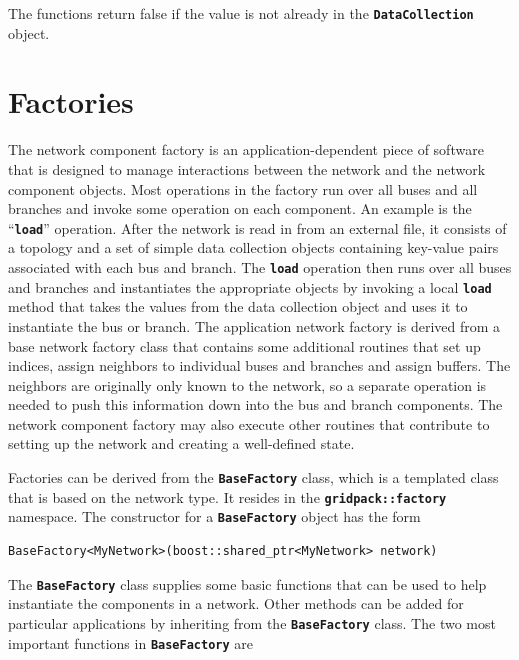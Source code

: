 \documentclass[12pt]{report} %
\begin{document}
The functions return false if the value is not already in the \texttt{\textbf{DataCollection}} object.

\section{Factories}

The network component factory is an application-dependent piece of software that is designed to manage interactions between the network and the network component objects. Most operations in the factory run over all buses and all branches and invoke some operation on each component. An example is the ``\texttt{\textbf{load}}'' operation. After the network is read in from an external file, it consists of a topology and a set of simple data collection objects containing key-value pairs associated with each bus and branch. The \texttt{\textbf{load}} operation then runs over all buses and branches and instantiates the appropriate objects by invoking a local \texttt{\textbf{load}} method that takes the values from the data collection object and uses it to instantiate the bus or branch. The application network factory is derived from a base network factory class that contains some additional routines that set up indices, assign neighbors to individual buses and branches and assign buffers. The neighbors are originally only known to the network, so a separate operation is needed to push this information down into the bus and branch components. The network component factory may also execute other routines that contribute to setting up the network and creating a well-defined state.

Factories can be derived from the \texttt{\textbf{BaseFactory}} class, which is a templated class that is based on the network type. It resides in the \texttt{\textbf{gridpack::factory}} namespace. The constructor for a \texttt{\textbf{BaseFactory}} object has the form

{
\color{red}
\begin{Verbatim}[fontseries=b]
BaseFactory<MyNetwork>(boost::shared_ptr<MyNetwork> network)
\end{Verbatim}
}

The \texttt{\textbf{BaseFactory}} class supplies some basic functions that can be used to help instantiate the components in a network. Other methods can be added for particular applications by inheriting from the \texttt{\textbf{BaseFactory}} class. The two most important functions in \texttt{\textbf{BaseFactory}} are
\end{document}
